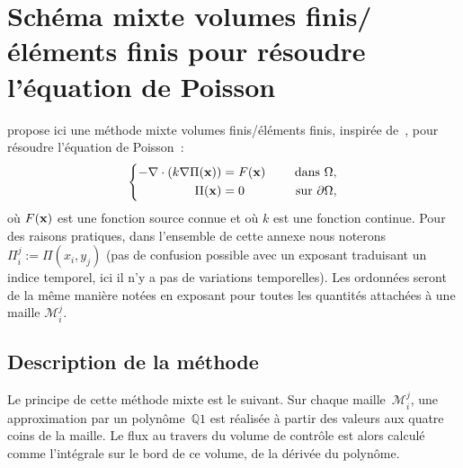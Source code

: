 \documentclass[main.tex]{subfiles}
\begin{document}
\chapter{\label{chap:anx_methode_mixte_VFEF}Schéma mixte volumes finis/éléments finis pour résoudre l'équation de Poisson}

\allowdisplaybreaks[1]
 propose ici une méthode mixte volumes finis/éléments finis, inspirée de~\cite{latige2013second}, pour résoudre l'équation de Poisson~:
\begin{equation}\label{eq:anx_poisson}
\left\{
\begin{aligned}
-\nabla\cdot ( k \nabla \Pi(\mathbf{x}) ) &= F(\mathbf{x}) & \quad \textrm{ dans }  \Omega , \\
\Pi(\mathbf{x}) &=0 & \quad \textrm{ sur  } \partial \Omega,
\end{aligned}
\right.
\end{equation}
où $F(\mathbf{x})$ est une fonction source connue et où $k$ est une fonction continue. Pour des raisons pratiques, dans l'ensemble de cette annexe nous noterons $\Pi_i^j := \Pi(x_i,y_j)$ (pas de confusion possible avec un exposant traduisant un indice temporel, ici il n'y a pas de variations temporelles). Les ordonnées seront de la même manière notées en exposant pour toutes les quantités attachées à une maille $\mathcal{M}_i^j$.

\section{Description de la méthode}
Le principe de cette méthode mixte est le suivant. 
Sur chaque maille~$\mathcal{M}_i^j$, une approximation par un polynôme~$\mathbb{Q}1$ est réalisée à partir des valeurs aux quatre coins de la maille. Le flux au travers du volume de contrôle est alors calculé comme l'intégrale sur le bord de ce volume, de la dérivée du polynôme. 
\end{document}
